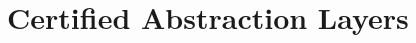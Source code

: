 \documentclass[acmsmall,screen,review,anonymous,nonacm]{acmart}
\newcommand{\kw}[1]{\ensuremath{ \mathsf{#1} }}
\newcommand{\Clight}{\ensuremath{ \mathsf{Clight} }}
\begin{document}







\section{Certified Abstraction Layers} \label{app:cal} %
\end{document}
